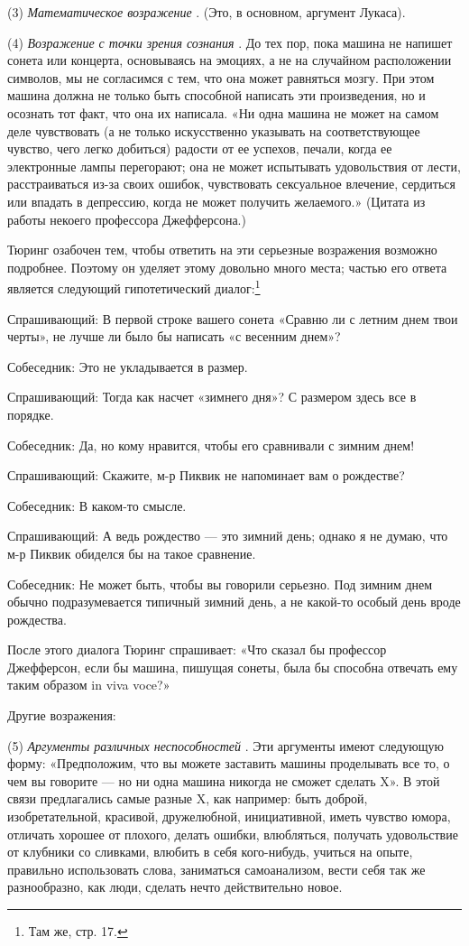 (3) \emph{Математическое возражение} . (Это, в основном, аргумент Лукаса).

(4) \emph{Возражение с точки зрения сознания} . До тех пор, пока машина не напишет сонета или концерта, основываясь на эмоциях, а не на случайном расположении символов, мы не согласимся с тем, что она может равняться мозгу. При этом машина должна не только быть способной написать эти произведения, но и осознать тот факт, что она их написала. «Ни одна машина не может на самом деле чувствовать (а не только искусственно указывать на соответствующее чувство, чего легко добиться) радости от ее успехов, печали, когда ее электронные лампы перегорают; она не может испытывать удовольствия от лести, расстраиваться из-за своих ошибок, чувствовать сексуальное влечение, сердиться или впадать в депрессию, когда не может получить желаемого.» (Цитата из работы некоего профессора Джефферсона.)

Тюринг озабочен тем, чтобы ответить на эти серьезные возражения возможно подробнее. Поэтому он уделяет этому довольно много места; частью его ответа является следующий гипотетический диалог:\footnote{Там же, стр. 17.}

Спрашивающий: В первой строке вашего сонета «Сравню ли с летним днем твои черты», не лучше ли было бы написать «с весенним днем»?

Собеседник: Это не укладывается в размер.

Спрашивающий: Тогда как насчет «зимнего дня»? С размером здесь все в порядке.

Собеседник: Да, но кому нравится, чтобы его сравнивали с зимним днем!

Спрашивающий: Скажите, м-р Пиквик не напоминает вам о рождестве?

Собеседник: В каком-то смысле.

Спрашивающий: А ведь рождество --- это зимний день; однако я не думаю, что м-р Пиквик обиделся бы на такое сравнение.

Собеседник: Не может быть, чтобы вы говорили серьезно. Под зимним днем обычно подразумевается типичный зимний день, а не какой-то особый день вроде рождества.

После этого диалога Тюринг спрашивает: «Что сказал бы профессор Джефферсон, если бы машина, пишущая сонеты, была бы способна отвечать ему таким образом in viva voce?»

Другие возражения:

(5) \emph{Аргументы различных неспособностей} . Эти аргументы имеют следующую форму: «Предположим, что вы можете заставить машины проделывать все то, о чем вы говорите --- но ни одна машина никогда не сможет сделать X». В этой связи предлагались самые разные X, как например: быть доброй, изобретательной, красивой, дружелюбной, инициативной, иметь чувство юмора, отличать хорошее от плохого, делать ошибки, влюбляться, получать удовольствие от клубники со сливками, влюбить в себя кого-нибудь, учиться на опыте, правильно использовать слова, заниматься самоанализом, вести себя так же разнообразно, как люди, сделать нечто действительно новое.

